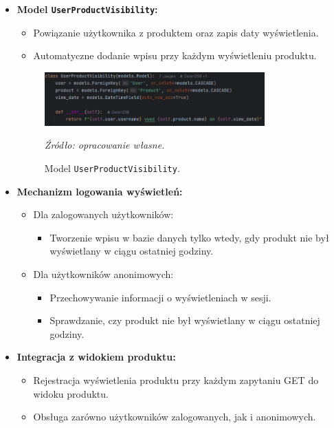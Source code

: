 \documentclass[12pt,a4paper,oneside]{article}
\theoremstyle{definition}
\numberwithin{equation}{section}
\begin{document}
\begin{itemize}
    \item \textbf{Model \texttt{UserProductVisibility}:}
    \begin{itemize}
        \item Powiązanie użytkownika z produktem oraz zapis daty wyświetlenia.
        \item Automatyczne dodanie wpisu przy każdym wyświetleniu produktu.
    \end{itemize}
    \begin{figure}[H]
        \centering
        \includegraphics[width=0.8\textwidth]{images/krzysztofBImages/product_visibility_model.png}
        \caption{Model \texttt{UserProductVisibility}.}
        \emph{Źródło: opracowanie własne.}
        \label{fig:user_product_visibility_model}
    \end{figure}
    \item \textbf{Mechanizm logowania wyświetleń:}
    \begin{itemize}
        \item Dla zalogowanych użytkowników:
        \begin{itemize}
            \item Tworzenie wpisu w bazie danych tylko wtedy, gdy produkt nie był wyświetlany w ciągu ostatniej godziny.
        \end{itemize}
        \item Dla użytkowników anonimowych:
        \begin{itemize}
            \item Przechowywanie informacji o wyświetleniach w sesji.
            \item Sprawdzanie, czy produkt nie był wyświetlany w ciągu ostatniej godziny.
        \end{itemize}
    \end{itemize}
    \item \textbf{Integracja z widokiem produktu:}
    \begin{itemize}
        \item Rejestracja wyświetlenia produktu przy każdym zapytaniu GET do widoku produktu.
        \item Obsługa zarówno użytkowników zalogowanych, jak i anonimowych.
    \end{itemize}
\end{itemize}
\end{document}
